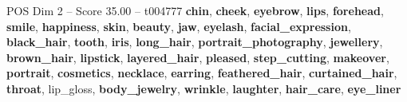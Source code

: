 \begin{textsample}{POS Dim 2 – Score 35.00 – t004777}  \label{ex:f2_pos_002}
\textbf{chin}, \textbf{cheek}, \textbf{eyebrow}, \textbf{lips}, \textbf{forehead}, \textbf{smile}, \textbf{happiness}, \textbf{skin}, \textbf{beauty}, \textbf{jaw}, \textbf{eyelash}, \textbf{facial\_expression}, \textbf{black\_hair}, \textbf{tooth}, \textbf{iris}, \textbf{long\_hair}, \textbf{portrait\_photography}, \textbf{jewellery}, \textbf{brown\_hair}, \textbf{lipstick}, \textbf{layered\_hair}, \textbf{pleased}, \textbf{step\_cutting}, \textbf{makeover}, \textbf{portrait}, \textbf{cosmetics}, \textbf{necklace}, \textbf{earring}, \textbf{feathered\_hair}, \textbf{curtained\_hair}, \textbf{throat}, lip\_gloss, \textbf{body\_jewelry}, \textbf{wrinkle}, \textbf{laughter}, \textbf{hair\_care}, \textbf{eye\_liner}

\end{textsample}
